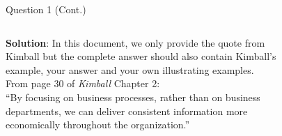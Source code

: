 \begin{frame}[fragile]{Question 1 (Cont.)}
	
\begin{columns}[t]
\textbf{Solution}: In this document, we only provide the quote from Kimball but the complete answer should also contain Kimball's example, your answer and your own illustrating examples. \\ \vspace{6pt}
From page 30 of \textit{Kimball} Chapter 2: \\ \vspace{6pt}
``By focusing on business processes, rather than on business departments, we can deliver consistent information more economically throughout the organization.''
\vspace{-15pt}
\begin{figure}
\end{figure}
\end{columns}
\end{frame}

